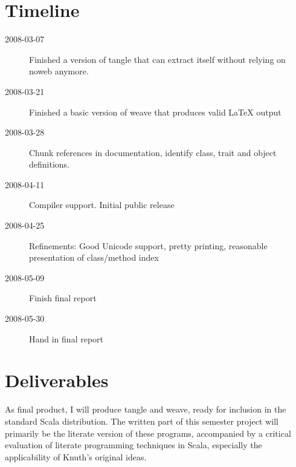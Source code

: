 \documentclass[a4paper,12pt]{article}
\begin{document}
\section{Timeline}
\begin{description}
\item[2008-03-07] Finished a version of tangle that can extract itself without
relying on noweb anymore.
\item[2008-03-21] Finished a basic version of weave that produces valid
LaTeX output
\item[2008-03-28] Chunk references in documentation, identify class, trait and
object definitions.
\item[2008-04-11] Compiler support. Initial public release
\item[2008-04-25] Refinements: Good Unicode support, pretty printing,
reasonable presentation of class/method index
\item[2008-05-09] Finish final report
\item[2008-05-30] Hand in final report
\end{description}

\section{Deliverables}
As final product, I will produce tangle and weave, ready for inclusion in the
standard Scala distribution. The written part of this semester project will
primarily be the literate version of these programs, accompanied by a
critical evaluation of literate programming techniques in Scala, especially
the applicability of Knuth's original ideas.
\end{document}
